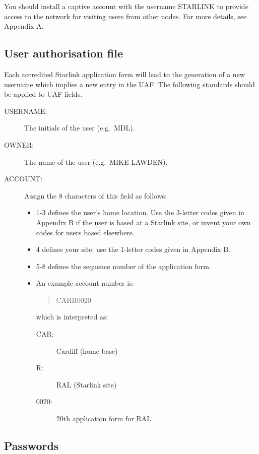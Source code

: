 You should install a captive account with the username STARLINK to provide
access to the network for visiting users from other nodes.
For more details, see Appendix A.

\subsection {User authorisation file}

Each accredited Starlink application form will lead to the generation of a new
username which implies a new entry in the UAF.
The following standards should be applied to UAF fields.
\begin{description}
\begin{description}
\item [USERNAME:] The initials of the user (e.g.\ MDL).
\item [OWNER:] The name of the user (e.g.\ MIKE LAWDEN).
\item [ACCOUNT:] Assign the 8 characters of this field as follows:
\begin{itemize}
\item 1-3 defines the user's home location.
Use the 3-letter codes given in Appendix B if the user is based at a Starlink
site, or invent your own codes for users based elsewhere.
\item 4 defines your site; use the 1-letter codes given in Appendix B.
\item 5-8 defines the sequence number of the application form.
\item An example account number is:
\begin{quote}
CARR0020
\end{quote}
which is interpreted as:
\begin{description}
\begin{description}
\item [CAR:] Cardiff (home base)
\item [R:] RAL (Starlink site)
\item [0020:] 20th application form for RAL
\end{description}
\end{description}
\end{itemize}
\end{description}
\end{description}

\subsection {Passwords}

